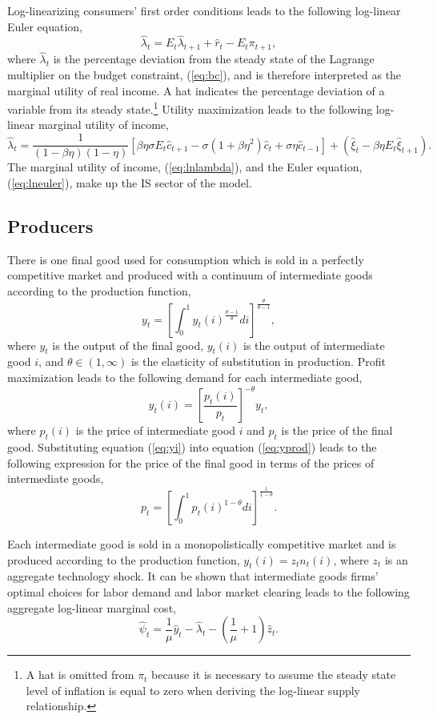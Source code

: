 \documentclass[12pt]{article}
\newcommand{\beq}{\begin{equation}}
\newcommand{\eeq}{\end{equation}}
\newcommand{\h}[1]{\hat{#1}}
\begin{document}
Log-linearizing consumers' first order conditions leads to the following log-linear Euler equation,
\beq \label{eq:lneuler} \h{\lambda}_{t} = E_t \h{\lambda}_{t+1} + \h{r}_t - E_t \pi_{t+1}, \eeq
where $\h{\lambda}_t$ is the percentage deviation from the steady state of the Lagrange multiplier on the budget constraint, (\ref{eq:bc}), and is therefore interpreted as the marginal utility of real income.  A hat indicates the percentage deviation of a variable from its steady state.\footnote{A hat is omitted from $\pi_t$ because it is necessary to assume the steady state level of inflation is equal to zero when deriving the log-linear supply relationship.}  Utility maximization leads to the following log-linear marginal utility of income,
\beq \label{eq:lnlambda} \h{\lambda}_t = \frac{1}{ (1-\beta \eta)(1-\eta)}\left[ \beta \eta \sigma E_t \h{c}_{t+1} - \sigma(1+\beta \eta^2) \h{c}_t + \sigma \eta \h{c}_{t-1} \right] + \left(\h{\xi}_t - \beta \eta E_t \h{\xi}_{t+1} \right). \eeq
The marginal utility of income, (\ref{eq:lnlambda}), and the Euler equation, (\ref{eq:lneuler}), make up the IS sector of the model.

\subsection{Producers}
There is one final good used for consumption which is sold in a perfectly competitive market and produced with a continuum of intermediate goods according to the production function,
\beq \label{eq:yprod} y_t = \left[ \int_0^1 y_t(i)^{\frac{\theta-1}{\theta}} di \right]^{\frac{\theta}{\theta-1}}, \eeq
where $y_t$ is the output of the final good, $y_t(i)$ is the output of intermediate good $i$, and $\theta\in(1,\infty)$ is the elasticity of substitution in production.  Profit maximization leads to the following demand for each intermediate good,
\beq \label{eq:yi} y_t(i) = \left[ \frac{p_t(i)}{p_t} \right]^{-\theta} y_t, \eeq
where $p_t(i)$ is the price of intermediate good $i$ and $p_t$ is the price of the final good.  Substituting equation (\ref{eq:yi}) into equation (\ref{eq:yprod}) leads to the following expression for the price of the final good in terms of the prices of intermediate goods,
\beq \label{eq:pfinal} p_t = \left[ \int_0^1 p_t(i)^{1-\theta} di \right]^{\frac{1}{1-\theta}}. \eeq

Each intermediate good is sold in a monopolistically competitive market and is produced according to the production function, $y_t(i) = z_t n_t(i)$, where $z_t$ is an aggregate technology shock.  It can be shown that intermediate goods firms' optimal choices for labor demand and labor market clearing leads to the following aggregate log-linear marginal cost,
\beq \label{eq:mc2} \h{\psi}_t = \frac{1}{\mu} \h{y}_t - \h{\lambda}_t - \left(\frac{1}{\mu} + 1\right) \h{z}_t. \eeq
\end{document}
